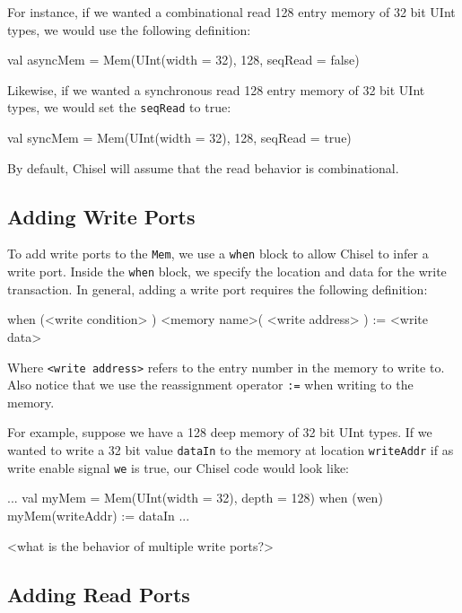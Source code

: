 \documentclass[twocolumn, 10pt]{article}
\begin{document}
For instance, if we wanted a combinational read 128 entry memory of 32 bit UInt types, we would use the following definition:

\begin{scala}
val asyncMem = Mem(UInt(width = 32), 128, seqRead = false)
\end{scala}

Likewise, if we wanted a synchronous read 128 entry memory of 32 bit UInt types, we would set the \verb+seqRead+ to true:

\begin{scala}
val syncMem = Mem(UInt(width = 32), 128, seqRead = true)
\end{scala}

By default, Chisel will assume that the read behavior is combinational.

\subsection{Adding Write Ports}

To add write ports to the \verb+Mem+, we use a \verb+when+ block to allow Chisel to infer a write port. Inside the \verb+when+ block, we specify the location and data for the write transaction. In general, adding a write port requires the following definition:

\begin{scala}
when (<write condition> ) {
  <memory name>( <write address> ) := <write data>
}
\end{scala}

Where \verb+<write address>+ refers to the entry number in the memory to write to. Also notice that we use the reassignment operator \verb+:=+ when writing to the memory. 


For example, suppose we have a 128 deep memory of 32 bit UInt types. If we wanted to write a 32 bit value \verb+dataIn+ to the memory at location \verb+writeAddr+ if as write enable signal \verb+we+ is true, our Chisel code would look like:

\begin{scala}
...
val myMem = Mem(UInt(width = 32), depth = 128)
when (wen) {
  myMem(writeAddr) := dataIn
}
...
\end{scala}

<what is the behavior of multiple write ports?>

\subsection{Adding Read Ports}
\end{document}
